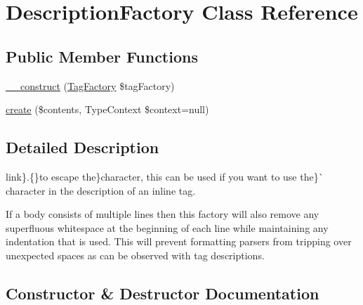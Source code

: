 \hypertarget{classphp_documentor_1_1_reflection_1_1_doc_block_1_1_description_factory}{}\section{Description\+Factory Class Reference}
\label{classphp_documentor_1_1_reflection_1_1_doc_block_1_1_description_factory}
\subsection*{Public Member Functions}
\begin{DoxyCompactItemize}
\item 
\mbox{\hyperlink{classphp_documentor_1_1_reflection_1_1_doc_block_1_1_description_factory_ad1084350511ea8852e00c380473c4d9b}{\+\_\+\+\_\+construct}} (\mbox{\hyperlink{interfacephp_documentor_1_1_reflection_1_1_doc_block_1_1_tag_factory}{Tag\+Factory}} \$tag\+Factory)
\item 
\mbox{\hyperlink{classphp_documentor_1_1_reflection_1_1_doc_block_1_1_description_factory_a492ed79ad4fa9de3da4f0644bd7d7510}{create}} (\$contents, Type\+Context \$context=null)
\end{DoxyCompactItemize}


\subsection{Detailed Description}
link\}{.}\{\}{\ttfamily to escape the}\}{\ttfamily character, this can be used if you want to use the}\}\`{} character in the description of an inline tag.

If a body consists of multiple lines then this factory will also remove any superfluous whitespace at the beginning of each line while maintaining any indentation that is used. This will prevent formatting parsers from tripping over unexpected spaces as can be observed with tag descriptions. 

\subsection{Constructor \& Destructor Documentation}
\mbox{\label{classphp_documentor_1_1_reflection_1_1_doc_block_1_1_description_factory_ad1084350511ea8852e00c380473c4d9b}} 
